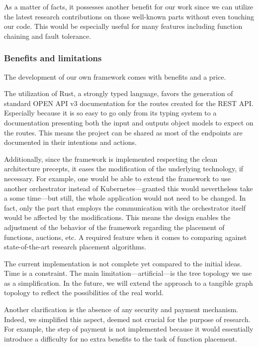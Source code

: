 As a matter of facts, it possesses another benefit for our work since we can utilize the latest research contributions on those well-known parts without even touching our code. This would be especially useful for many features including function chaining and fault tolerance.

\subsubsection{Benefits and limitations}

The development of our own framework comes with benefits and a price.

The utilization of Rust, a strongly typed language, favors the generation of standard OPEN API v3 documentation for the routes created for the \gls{REST} \gls{API}. Especially because it is so easy to go only from its typing system to a documentation presenting both the input and outputs object models to expect on the routes. This means the project can be shared as most of the endpoints are documented in their intentions and actions.

Additionally, since the framework is implemented respecting the clean architecture precepts, it eases the modification of the underlying technology, if necessary. For example, one would be able to extend the framework to use another orchestrator instead of Kubernetes—granted this would nevertheless take a some time—but still, the whole application would not need to be changed. In fact, only the part that employs the communication with the orchestrator itself would be affected by the modifications. This means the design enables the adjustment of the behavior of the framework regarding the placement of functions, auctions, etc. A required feature when it comes to comparing against state-of-the-art research placement algorithms.

The current implementation is not complete yet compared to the initial ideas. Time is a constraint. The main limitation—artificial—is the tree topology we use as a simplification. In the future, we will extend the approach to a tangible graph topology to reflect the possibilities of the real world.

Another clarification is the absence of any security and payment mechanism. Indeed, we simplified this aspect, deemed not crucial for the purpose of research. For example, the step of payment is not implemented because it would essentially introduce a difficulty for no extra benefits to the task of function placement.


